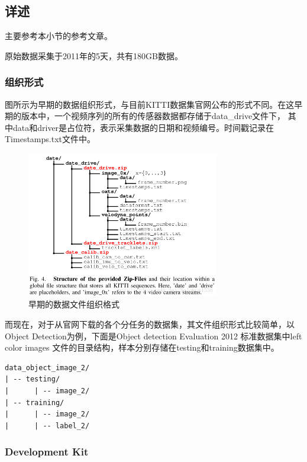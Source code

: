 \subsection{详述}

主要参考本小节的参考文章。

原始数据采集于2011年的5天，共有180GB数据。 

\subsubsection{组织形式}

图所示为早期的数据组织形式，与目前KITTI数据集官网公布的形式不同。在这早期的版本中，一个视频序列的所有的传感器数据都存储于data\_drive文件下， 其中data和driver是占位符，表示采集数据的日期和视频编号。时间戳记录在Timestamps.txt文件中。

\begin{figure}[!hbtp]
\centering
\includegraphics[width=0.75\textwidth]{SemanticSLAM/KITTI1.png}
\caption{早期的数据文件组织格式}
\label{KITTI1}
\end{figure}

而现在，对于从官网下载的各个分任务的数据集，其文件组织形式比较简单，以Object Detection为例，下面是Object detection Evaluation 2012 标准数据集中left color images 文件的目录结构，样本分别存储在testing和training数据集中。

\begin{verbatim}
data_object_image_2/
| -- testing/
|      | -- image_2/
| -- training/
|      | -- image_2/
|      | -- label_2/
\end{verbatim}

\subsubsection{Development Kit}

